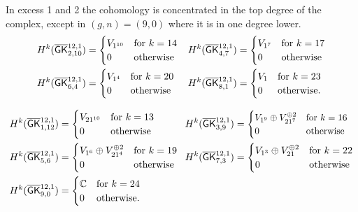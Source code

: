 In excess 1 and 2 the cohomology is concentrated in the top degree of the complex, except in $(g,n)=(9,0)$ where it is in one degree lower.
\begin{align*}
    H^k(\overline{\mathsf{GK}}{}^{12,1}_{2,10}) &=
    \begin{cases}
        V_{1^{10}} & \text{for $k=14$} \\
        0 & \text{otherwise}
    \end{cases}
&
H^k(\overline{\mathsf{GK}}{}^{12,1}_{4,7}) &=
    \begin{cases}
        V_{1^{7}} & \text{for $k=17$} \\
        0 & \text{otherwise}
    \end{cases}
\\
H^k(\overline{\mathsf{GK}}{}^{12,1}_{6,4}) &=
\begin{cases}
    V_{1^{4}} & \text{for $k=20$} \\
    0 & \text{otherwise}
\end{cases}     
&
H^k(\overline{\mathsf{GK}}{}^{12,1}_{8,1}) &=
\begin{cases}
    V_1 & \text{for $k=23$} \\
    0 & \text{otherwise.}
\end{cases}  
\end{align*}

\begin{align*}
  H^k(\myB_{1,12}) &=
  \begin{cases}
      V_{21^{10}} & \text{for $k=13$} \\
      0 & \text{otherwise}
  \end{cases}
  &
  H^k(\myB_{3,9}) &=
  \scalebox{.95}{$\begin{cases}
      V_{1^{9}}\oplus V_{21^7}^{\oplus 2} & \text{for $k=16$} \\
      0 & \text{otherwise}
  \end{cases}$
  }
  \\
  H^k(\myB_{5,6}) &=
  \begin{cases}
    V_{1^{6}}\oplus V_{21^4}^{\oplus 2} & \text{for $k=19$} \!\! \\
    0 & \text{otherwise}
\end{cases}
  &
  H^k(\myB_{7,3}) &=
  \begin{cases}
    V_{1^{3}}\oplus V_{21}^{\oplus 2} & \text{for $k=22$} \\
    0 & \text{otherwise}
\end{cases}
  \\
  H^k(\myB_{9,0}) &=
  \begin{cases}
    \mathbb C & \text{for $k=24$} \\
    0 & \text{otherwise.}
  \end{cases}
\end{align*}

